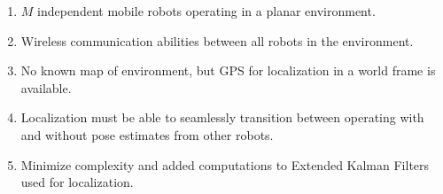 \documentclass[thesis.tex]{subfile}
\begin{document}
\begin{enumerate}
\item $M$ independent mobile robots operating in a planar environment.
\item Wireless communication abilities between all robots in the environment.
\item No known map of environment, but GPS for localization in a world frame is available.
\item Localization must be able to seamlessly transition between operating with and without pose estimates from other robots.
\item Minimize complexity and added computations to Extended Kalman Filters used for localization.
\end{enumerate}
\end{document}
